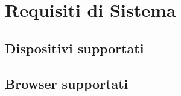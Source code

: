\newpage
\section{Requisiti di Sistema}
\subsection{Dispositivi supportati}
\subsection{Browser supportati}